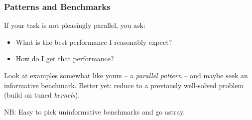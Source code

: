 \documentclass{beamer}
\begin{document}
\begin{frame}
  \frametitle{Patterns and Benchmarks}

  If your task is not pleasingly parallel, you ask:
  \begin{itemize}
  \item What is the best performance I reasonably expect?
  \item How do I get that performance?
  \end{itemize}
  Look at examples somewhat like yours --
  a {\em parallel pattern} -- and maybe seek an informative
  benchmark.  Better yet: reduce to a previously
  well-solved problem (build on tuned {\em kernels}).

  \vspace{1cm}
  NB: Easy to pick uninformative benchmarks and go astray.
\end{frame}
\end{document}
